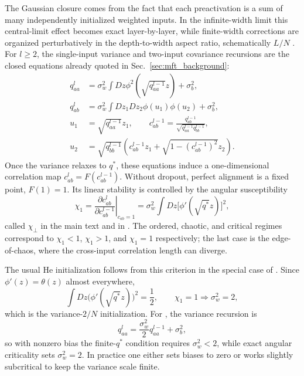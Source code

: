The Gaussian closure comes from the fact that each preactivation is a sum of many independently initialized weighted inputs. In the infinite-width limit this central-limit effect becomes exact layer-by-layer, while finite-width corrections are organized perturbatively in the depth-to-width aspect ratio, schematically $L/N$ \cite{roberts2022principlesdeeplearningtheory}. For $l\ge2$, the single-input variance and two-input covariance recursions are the closed equations already quoted in Sec.~\ref{sec:mft_background}:
\begin{align}
q^{l}_{aa}&=\sigma_{w}^{2}\int Dz \phi^{2}\left(\sqrt{q^{l-1}_{aa}} z\right)+\sigma_{b}^{2},\nonumber\\
q^{l}_{ab}&=\sigma_{w}^{2}\int Dz_{1} Dz_{2} \phi(u_{1}) \phi(u_{2})+\sigma_{b}^{2},\nonumber\\
u_{1}&=\sqrt{q^{l-1}_{aa}} z_{1},\qquad c^{l-1}_{ab}=\frac{q^{l-1}_{ab}}{\sqrt{q^{l-1}_{aa} q^{l-1}_{bb}}},\nonumber\\
u_{2}&=\sqrt{q^{l-1}_{bb}}\left(c^{l-1}_{ab}z_{1}+\sqrt{1-\left(c^{l-1}_{ab}\right)^{2}} z_{2}\right).
\end{align}
Once the variance relaxes to $q^*$, these equations induce a one-dimensional correlation map $c^l_{ab}=F(c^{l-1}_{ab})$. Without dropout, perfect alignment is a fixed point, $F(1)=1$. Its linear stability is controlled by the angular susceptibility
\begin{equation}
\chi_{1}=\left.\frac{\partial c^{l}_{ab}}{\partial c^{l-1}_{ab}}\right|_{c_{ab}=1}=\sigma_{w}^{2}\int Dz \big[\phi'(\sqrt{q^{*}} z)\big]^{2},
\end{equation}
called $\chi_\perp$ in the main text and in \cite{roberts2022principlesdeeplearningtheory}. The ordered, chaotic, and critical regimes correspond to $\chi_1<1$, $\chi_1>1$, and $\chi_1=1$ respectively; the last case is the edge-of-chaos, where the cross-input correlation length can diverge.

The usual He initialization follows from this criterion in the special case of \relu{}. Since $\phi'(z)=\theta(z)$ almost everywhere,
\begin{equation}
\int Dz \big(\phi'(\sqrt{q^{*}}z)\big)^2=\frac12,
\qquad \chi_1=1 \Longrightarrow \sigma_w^2=2,
\end{equation}
which is the variance-$2/N$ initialization. For \relu{}, the variance recursion is
\begin{equation}
q^{l}_{aa}=\frac{\sigma_w^2}{2} q^{l-1}_{aa}+\sigma_b^2,
\end{equation}
so with nonzero bias the finite-$q^*$ condition requires $\sigma_w^2<2$, while exact angular criticality sets $\sigma_w^2=2$. In practice one either sets biases to zero or works slightly subcritical to keep the variance scale finite.

